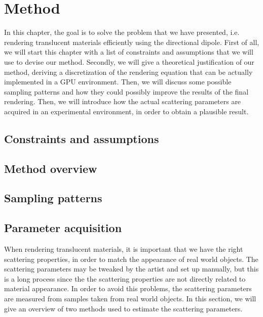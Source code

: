 \chapter{Method}
In this chapter, the goal is to solve the problem that we have presented, i.e. rendering translucent materials efficiently using the directional dipole. First of all, we will start this chapter with a list of constraints and assumptions that we will use to devise our method. Secondly, we will give a theoretical justification of our method, deriving a discretization of the rendering equation that can be actually implemented in a GPU environment. Then, we will discuss some possible sampling patterns and how they could possibly improve the results of the final rendering. Then, we will introduce how the actual scattering parameters are acquired in an experimental environment, in order to obtain a plausible result. 


\section{Constraints and assumptions}

\section{Method overview}

\section{Sampling patterns}

\section{Parameter acquisition}
When rendering translucent materials, it is important that we have the right scattering properties, in order to match the appearance of real world objects. The scattering parameters may be tweaked by the artist and set up manually, but this is a long process since the the scattering properties are not directly related to material appearance. In order to avoid this problems, the scattering parameters are measured from samples taken from real world objects. In this section, we will give an overview of two methods used to estimate the scattering parameters.

